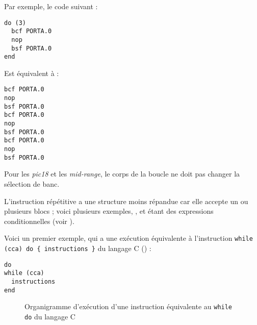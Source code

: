 Par exemple, le code suivant :
\begin{lstlisting}[language=piccolo]
do (3)
  bcf PORTA.0
  nop
  bsf PORTA.0
end
\end{lstlisting}

Est équivalent à :
\begin{lstlisting}[language=piccolo]
bcf PORTA.0
nop
bsf PORTA.0
bcf PORTA.0
nop
bsf PORTA.0
bcf PORTA.0
nop
bsf PORTA.0
\end{lstlisting}


Pour les \emph{pic18} et les \emph{mid-range}, le corps de la boucle ne doit pas changer la sélection de banc.










L'instruction répétitive a une structure moins répandue car elle accepte un ou plusieurs blocs  ; voici plusieurs exemples, ,  et  étant des expressions conditionnelles (voir ).


Voici un premier exemple, qui a une exécution équivalente à l'instruction \texttt{while (cca) do \{ instructions \}} du langage C () :
\begin{lstlisting}[language=piccolo]
do
while (cca)
  instructions
end
\end{lstlisting}

\begin{figure}[!ht]
  \centering
  \small
  \caption{Organigramme d'exécution d'une instruction équivalente au  \texttt{while} \texttt{do} du langage C}
\end{figure}

